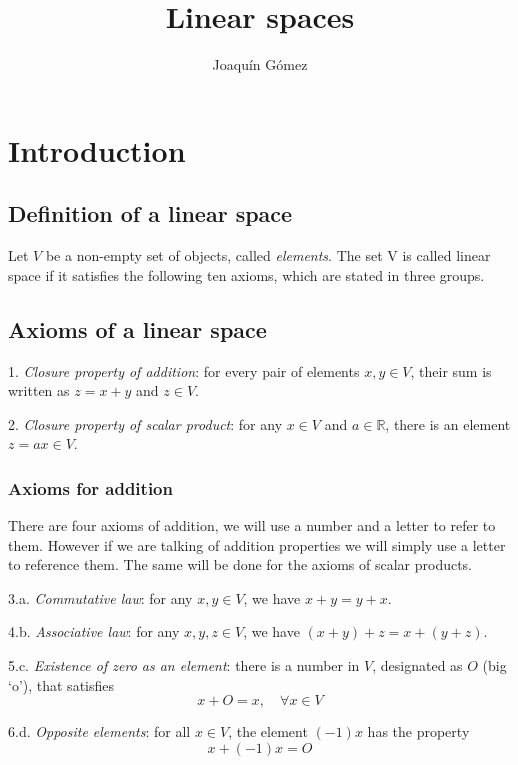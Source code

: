 \documentclass{book}
\title{Linear spaces}
\author{Joaquín Gómez}
\begin{document}
\frontmatter
\maketitle
\tableofcontents

\mainmatter
\chapter{Introduction}
\section{Definition of a linear space}
Let $V$ be a non-empty set of objects, called \textit{elements}. The set V is
called linear space if it satisfies the following ten axioms, which are stated
in three groups.

\section*{Axioms of a linear space}

\begin{list}{Axiom}{}
    \item 1.\textit{ Closure property of addition}: for every pair of elements $x,y\in V$, their sum is written as $z=x+y$ and $z\in V$.
    \item 2.\textit{ Closure property of scalar product}: for any $x\in V$ and $a\in\mathbb R$, there is an element $z=ax\in V$.
\end{list}

\subsection*{Axioms for addition}

There are four axioms of addition, we will use a number and a letter to refer
to them. However if we are talking of addition properties we will simply use a
letter to reference them. The same will be done for the axioms of scalar
products.

\begin{list}{Axiom}{}
    \item 3.a.\textit{ Commutative law}: for any $x,y\in V$, we have $x+y = y+x$.
    \item 4.b.\textit{ Associative law}: for any $x,y,z\in V$, we have $(x+y) + z = x + (y + z)$.
    \item 5.c.\textit{ Existence of zero as an element}: there is a number in $V$, designated as $O$ (big `o'), that satisfies
          \[
              x + O = x,\quad \forall x \in V
          \]

    \item 6.d.\textit{ Opposite elements}: for all $x\in V$, the element $(-1)x$ has the property
          \[
              x + (-1)x = O
          \]
\end{list}
\end{document}
